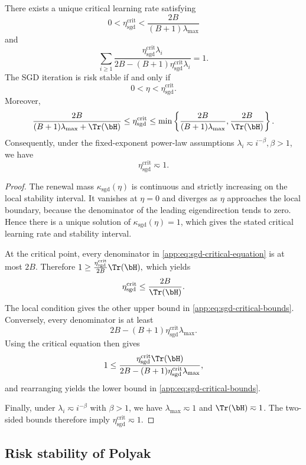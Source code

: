 \documentclass[11pt]{article}
\newcommand{\sgd}{\mathrm{sgd}}
\newcommand{\crit}{\mathrm{crit}}
\begin{document}
\begin{corollary}
\label{app:cor:sgd-critical-rate}
There exists a unique critical learning rate satisfying
\[
0<\eta_{\sgd}^{\crit}<\frac{2B}{(B+1)\lambda_{\max}}
\]
and
\begin{equation}
\label{app:eq:sgd-critical-equation}
\sum_{i\geq1}
\frac{
\eta_{\sgd}^{\crit}\lambda_i
}{
2B-(B+1)\eta_{\sgd}^{\crit}\lambda_i
}
=1.
\end{equation}
The SGD iteration is risk stable if and only if
\[
0<\eta<\eta_{\sgd}^{\crit}.
\]
Moreover,
\begin{equation}
\label{app:eq:sgd-critical-bounds}
\frac{2B}{(B+1)\lambda_{\max}+\Tr(\bH)}
\leq
\eta_{\sgd}^{\crit}
\leq
\min\left\{
\frac{2B}{(B+1)\lambda_{\max}},
\frac{2B}{\Tr(\bH)}
\right\}.
\end{equation}
Consequently, under the fixed-exponent power-law assumptions
\(
\lambda_i\eqsim i^{-\beta},
\beta>1
\), we have
\[
\eta_{\sgd}^{\crit}\eqsim1.
\]
\end{corollary}

\begin{proof}
The renewal mass \(\kappa_{\sgd}(\eta)\) is continuous and strictly increasing on the local stability interval. It vanishes at \(\eta=0\) and diverges as \(\eta\) approaches the local boundary, because the denominator of the leading eigendirection tends to zero. Hence there is a unique solution of \(\kappa_{\sgd}(\eta)=1\), which gives the stated critical learning rate and stability interval.

At the critical point, every denominator in \eqref{app:eq:sgd-critical-equation} is at most \(2B\). Therefore
\(1\geq\frac{\eta_{\sgd}^{\crit}}{2B}\Tr(\bH),\)
which yields
\[
\eta_{\sgd}^{\crit}
\leq
\frac{2B}{\Tr(\bH)}.
\]
The local condition gives the other upper bound in \eqref{app:eq:sgd-critical-bounds}. Conversely, every denominator is at least
\[
2B-(B+1)\eta_{\sgd}^{\crit}\lambda_{\max}.
\]
Using the critical equation then gives
\[
1
\leq
\frac{
\eta_{\sgd}^{\crit}\Tr(\bH)
}{
2B-(B+1)\eta_{\sgd}^{\crit}\lambda_{\max}
},
\]
and rearranging yields the lower bound in \eqref{app:eq:sgd-critical-bounds}.

Finally, under \(\lambda_i\eqsim i^{-\beta}\) with \(\beta>1\), we have \(\lambda_{\max}\eqsim1\) and \(\Tr(\bH)\eqsim1\). The two-sided bounds therefore imply \(\eta_{\sgd}^{\crit}\eqsim1\).
\end{proof}



\subsection{Risk stability of Polyak}
\label{app:subsec:polyak-stability}
\end{document}
